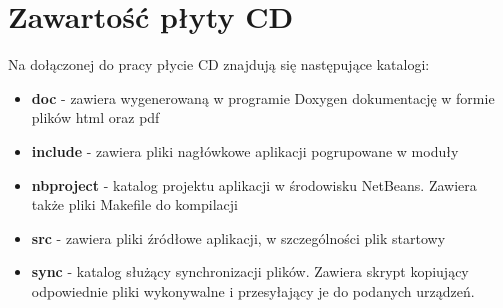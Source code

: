 \section{Zawartość płyty CD}
\label{ch:zawartosc_plyty}

Na dołączonej do pracy płycie CD znajdują się następujące katalogi:

\begin{itemize}
    \item \textbf{doc} - zawiera wygenerowaną w programie Doxygen dokumentację w formie plików html oraz pdf
    \item \textbf{include} - zawiera pliki nagłówkowe aplikacji pogrupowane w moduły
    \item \textbf{nbproject} - katalog projektu aplikacji w środowisku NetBeans. Zawiera także pliki Makefile do kompilacji
    \item \textbf{src} - zawiera pliki źródłowe aplikacji, w szczególności plik startowy
    \item \textbf{sync} - katalog służący synchronizacji plików. Zawiera skrypt kopiujący odpowiednie pliki wykonywalne i przesyłający je do podanych urządzeń.
\end{itemize}
